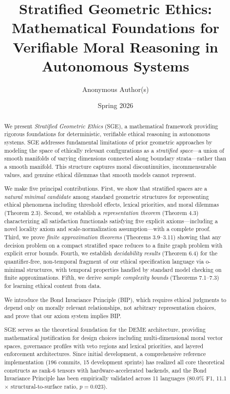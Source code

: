 \documentclass[12pt]{article}
\title{Stratified Geometric Ethics: Mathematical Foundations for
Verifiable Moral Reasoning in Autonomous Systems}
\author{Anonymous Author(s)}
\date{Spring 2026}
\theoremstyle{plain}
\theoremstyle{definition}
\theoremstyle{remark}
\begin{document}
\maketitle

\begin{abstract}
We present \emph{Stratified Geometric Ethics} (SGE), a mathematical
framework providing rigorous foundations for deterministic, verifiable
ethical reasoning in autonomous systems. SGE addresses fundamental
limitations of prior geometric approaches by modeling the space of
ethically relevant configurations as a \emph{stratified space}---a union
of smooth manifolds of varying dimensions connected along boundary
strata---rather than a smooth manifold. This structure captures moral
discontinuities, incommensurable values, and genuine ethical dilemmas
that smooth models cannot represent.

We make five principal contributions. First, we show that stratified
spaces are a \emph{natural minimal candidate} among standard geometric
structures for representing ethical phenomena including threshold
effects, lexical priorities, and moral dilemmas (Theorem 2.3). Second,
we establish a \emph{representation theorem} (Theorem 4.3)
characterizing all satisfaction functionals satisfying five explicit
axioms---including a novel locality axiom and scale-normalization
assumption---with a complete proof. Third, we prove \emph{finite
approximation theorems} (Theorems 3.9--3.11) showing that any decision
problem on a compact stratified space reduces to a finite graph problem
with explicit error bounds. Fourth, we establish \emph{decidability
results} (Theorem 6.4) for the quantifier-free, non-temporal fragment of
our ethical specification language via o-minimal structures, with
temporal properties handled by standard model checking on finite
approximations. Fifth, we derive \emph{sample complexity bounds}
(Theorems 7.1--7.3) for learning ethical content from data.

We introduce the Bond Invariance Principle (BIP), which requires ethical
judgments to depend only on morally relevant relationships, not
arbitrary representation choices, and prove that our axiom system
implies BIP.

SGE serves as the theoretical foundation for the DEME architecture,
providing mathematical justification for design choices including
multi-dimensional moral vector spaces, governance profiles with veto
regions and lexical priorities, and layered enforcement architectures.
Since initial development, a comprehensive reference implementation
(196 commits, 15 development sprints) has realized all core theoretical
constructs as rank-6 tensors with hardware-accelerated backends,
and the Bond Invariance Principle has been empirically validated across
11 languages (80.0\% F1, 11.1$\times$ structural-to-surface ratio,
\(p = 0.023\)).
\end{abstract}
\end{document}
